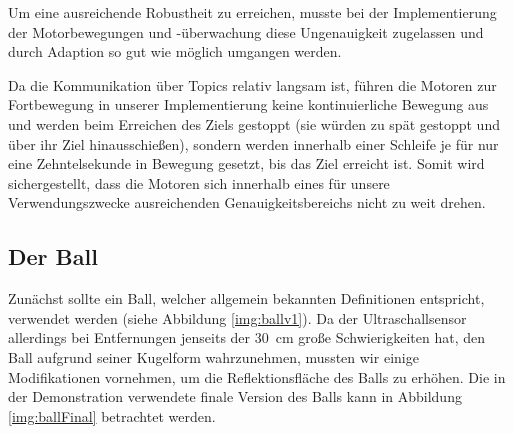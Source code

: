\documentclass{fetch-my-doc}
\begin{document}
      Um eine ausreichende Robustheit zu erreichen, musste bei der Implementierung der Motorbewegungen und -überwachung diese Ungenauigkeit zugelassen und durch Adaption so gut wie möglich umgangen werden.
      
      Da die Kommunikation über Topics relativ langsam ist, führen die Motoren zur Fortbewegung in unserer Implementierung keine kontinuierliche Bewegung aus und werden beim Erreichen des Ziels gestoppt (sie würden zu spät gestoppt und über ihr Ziel hinausschießen), sondern werden innerhalb einer Schleife je für nur eine Zehntelsekunde in Bewegung gesetzt, bis das Ziel erreicht ist. Somit wird sichergestellt, dass die Motoren sich innerhalb eines für unsere Verwendungszwecke ausreichenden Genauigkeitsbereichs nicht zu weit drehen.
    
    \subsection{Der Ball}
      Zunächst sollte ein Ball, welcher allgemein bekannten Definitionen entspricht, verwendet werden (siehe Abbildung \ref{img:ballv1}). Da der Ultraschallsensor allerdings bei Entfernungen jenseits der \SI{30}{\centi\meter} große Schwierigkeiten hat, den Ball aufgrund seiner Kugelform wahrzunehmen, mussten wir einige Modifikationen vornehmen, um die Reflektionsfläche des Balls zu erhöhen. Die in der Demonstration verwendete finale Version des Balls kann in Abbildung \ref{img:ballFinal} betrachtet werden.
\end{document}
